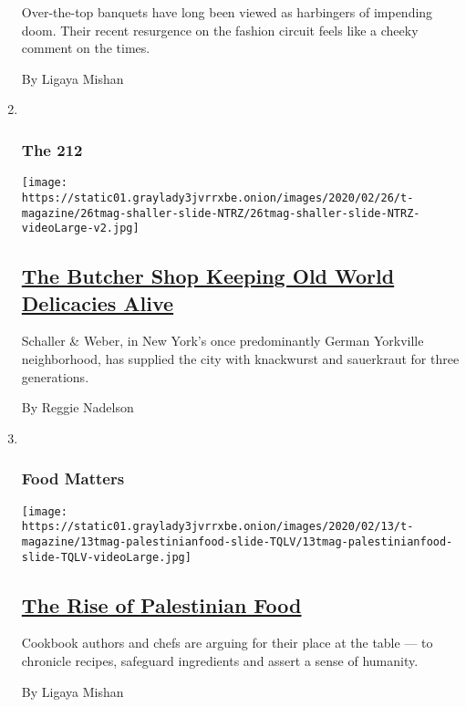 \begin{enumerate}
  Over-the-top banquets have long been viewed as harbingers of impending
  doom. Their recent resurgence on the fashion circuit feels like a
  cheeky comment on the times.

  By Ligaya Mishan
\item ~
  \hypertarget{the-212-1}{%
  \subsubsection{The 212}\label{the-212-1}}

  \texttt{[image: https://static01.graylady3jvrrxbe.onion/images/2020/02/26/t-magazine/26tmag-shaller-slide-NTRZ/26tmag-shaller-slide-NTRZ-videoLarge-v2.jpg]}

  \hypertarget{the-butcher-shop-keeping-old-world-delicacies-alive}{%
  \subsection{\texorpdfstring{\href{/2020/02/26/t-magazine/schaller-weber.html}{The
  Butcher Shop Keeping Old World Delicacies
  Alive}}{The Butcher Shop Keeping Old World Delicacies Alive}}\label{the-butcher-shop-keeping-old-world-delicacies-alive}}

  Schaller \& Weber, in New York's once predominantly German Yorkville
  neighborhood, has supplied the city with knackwurst and sauerkraut for
  three generations.

  By Reggie Nadelson
\item ~
  \hypertarget{food-matters}{%
  \subsubsection{Food Matters}\label{food-matters}}

  \texttt{[image: https://static01.graylady3jvrrxbe.onion/images/2020/02/13/t-magazine/13tmag-palestinianfood-slide-TQLV/13tmag-palestinianfood-slide-TQLV-videoLarge.jpg]}

  \hypertarget{the-rise-of-palestinian-food}{%
  \subsection{\texorpdfstring{\href{/2020/02/12/t-magazine/palestinian-food.html}{The
  Rise of Palestinian
  Food}}{The Rise of Palestinian Food}}\label{the-rise-of-palestinian-food}}

  Cookbook authors and chefs are arguing for their place at the table
  --- to chronicle recipes, safeguard ingredients and assert a sense of
  humanity.

  By Ligaya Mishan
\end{enumerate}

